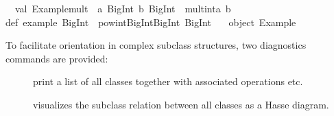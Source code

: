 \begin{isabellebody}
\begin{isamarkuptext}
\ \ val\ {}Example{}mult{}\ {}\ {}a{}\ BigInt{}\ b{}\ BigInt{}\ {}{}\ mult{}int{}a{}\ b{}\isanewline
{}\isanewline
\isanewline
def\ example{}\ BigInt\ {}\ pow{}int{}BigInt{}{}BigInt{}{}{}{}{}\ BigInt{}{}\ {}{}{}\isanewline
\isanewline
{}\ {}{}\ object\ Example\ {}{}\isanewline%
\end{isamarkuptext}%
\isamarkuptrue%
%
\endisatagquotetypewriter
{\isafoldquotetypewriter}%
%
\isadelimquotetypewriter
%
\endisadelimquotetypewriter
%
\isamarkuptrue%
%
\begin{isamarkuptext}%
To facilitate orientation in complex subclass structures, two
  diagnostics commands are provided:

  \begin{description}

    \item[\hyperlink{command.print-classes}{\mbox{}}] print a list of all classes
      together with associated operations etc.

    \item[\hyperlink{command.class-deps}{\mbox{}}] visualizes the subclass relation
      between all classes as a Hasse diagram.

  \end{description}%
\end{isamarkuptext}%
\isamarkuptrue%
%
\isadelimtheory
%
\endisadelimtheory
%
\isatagtheory
{}\isamarkupfalse%
%
\endisatagtheory
{\isafoldtheory}%
%
\isadelimtheory
%
\endisadelimtheory
\isanewline
\end{isabellebody}%
